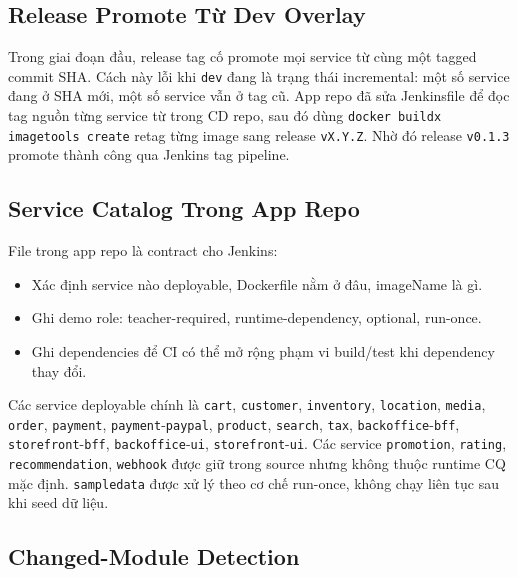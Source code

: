 \subsection{Release Promote Từ Dev Overlay}

Trong giai đoạn đầu, release tag cố promote mọi service từ cùng một tagged commit
SHA. Cách này lỗi khi \texttt{dev} đang là trạng thái incremental: một số service
đang ở SHA mới, một số service vẫn ở tag cũ. App repo đã sửa Jenkinsfile để đọc
tag nguồn từng service từ  trong CD repo,
sau đó dùng \texttt{docker buildx imagetools create} retag từng image sang release
\texttt{vX.Y.Z}. Nhờ đó release \texttt{v0.1.3} promote thành công qua Jenkins tag pipeline.

\subsection{Service Catalog Trong App Repo}

File  trong app repo là contract cho Jenkins:

\begin{itemize}
    \item Xác định service nào deployable, Dockerfile nằm ở đâu, imageName là gì.
    \item Ghi demo role: teacher-required, runtime-dependency, optional, run-once.
    \item Ghi dependencies để CI có thể mở rộng phạm vi build/test khi dependency thay đổi.
\end{itemize}

{\raggedright
Các service deployable chính là \texttt{cart}, \texttt{customer}, \texttt{inventory},
\texttt{location}, \texttt{media}, \texttt{order}, \texttt{payment},
\texttt{payment}-\allowbreak\texttt{paypal}, \texttt{product}, \texttt{search}, \texttt{tax},
\texttt{backoffice}-\allowbreak\texttt{bff}, \texttt{storefront}-\allowbreak\texttt{bff}, \texttt{backoffice}-\allowbreak\texttt{ui},
\texttt{storefront}-\allowbreak\texttt{ui}. Các service \texttt{promotion}, \texttt{rating},
\texttt{recommendation}, \texttt{webhook} được giữ trong source nhưng không thuộc
runtime CQ mặc định. \texttt{sampledata} được xử lý theo cơ chế run-once, không
chạy liên tục sau khi seed dữ liệu.\par}

\subsection{Changed-Module Detection}

